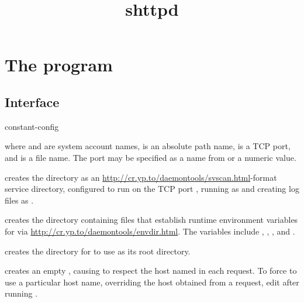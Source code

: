 \documentclass{book}
\title{shttpd}
\begin{document}
\section{The  program}

\subsection{Interface}
\begin{code}
  constant-config     
\end{code}
where  and  are system account names,
 is an absolute path name,  is a TCP port, and
 is a file name.  The port may be specified as a name from
 or a numeric value.

 creates the directory  as an
\href{svscan}{http://cr.yp.to/daemontools/svscan.html}-format service
directory, configured to run  on the TCP port
, running  as  and creating log
files as .

 creates the directory 
containing files that establish runtime environment variables for
 via \href{envdir}{http://cr.yp.to/daemontools/envdir.html}.
The variables include , , , and
.

 creates the directory  for
 to use as its root directory.

 creates an empty
, causing  to
respect the host named in each request.  To force
 to use a particular host name, overriding the
host obtained from a request, edit 
after running .
\end{document}
